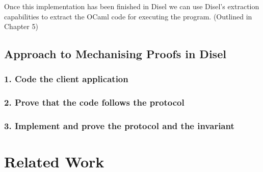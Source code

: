 Once this implementation has been finished in Disel we can use Disel's extraction
capabilities to extract the OCaml code for executing the program. (Outlined in Chapter 5)


\subsection{Approach to Mechanising Proofs in Disel}
%
%
%
%
%
%
%
%

\subsubsection{1. Code the client application}

\subsubsection{2. Prove that the code follows the protocol}

\subsubsection{3. Implement and prove the protocol and the invariant}



\section{Related Work}
